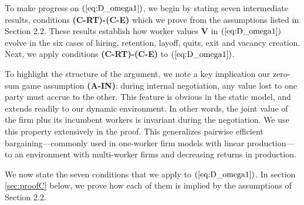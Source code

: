 To make progress on $(\ref{eq:D_omega1})$, we begin by stating seven intermediate results, conditions \textbf{(C-RT)-(C-E)} which we prove from
the assumptions listed in Section 2.2. These results establish how worker values \textbf{$\bm{V}$} in $(\ref{eq:D_omega1})$ evolve in the six cases of hiring, retention, layoff, quits, exit and vacancy creation. Next, we apply conditions \textbf{(C-RT)-(C-E)} to $(\ref{eq:D_omega1})$.

To highlight the structure of the argument, we note a key implication our zero-sum game assumption \textbf{(A-IN)}: during internal negotiation, any value lost to one party must accrue to the other. This feature is obvious in the static model, and extends readily to our dynamic environment. 
In other words, the joint value of the firm plus its incumbent workers is invariant during the negotiation. We use this property extensively in the proof. This generalizes pairwise efficient bargaining---commonly used in one-worker firm models with linear production---to an environment with multi-worker firms and decreasing returns in production.

We now state the seven conditions that we apply to $(\ref{eq:D_omega1})$. In section \ref{sec:proofC} below, we prove how each of them is implied by the
assumptions of Section $2.2$.

